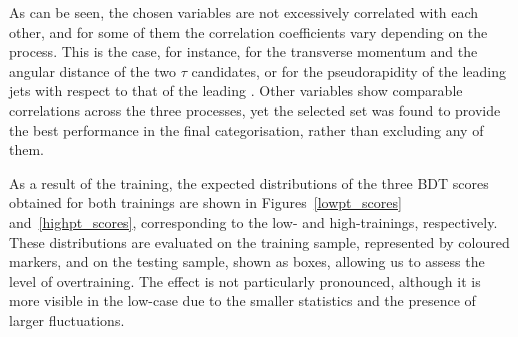 As can be seen, the chosen variables are not excessively correlated with each other, and for some of them the correlation coefficients vary depending on the process. This is the case, for instance, for the transverse momentum and the angular distance of the two $\tau$ candidates, or for the pseudorapidity of the leading jets with respect to that of the leading \tauhad. Other variables show comparable correlations across the three processes, yet the selected set was found to provide the best performance in the final categorisation, rather than excluding any of them.

As a result of the training, the expected distributions of the three BDT scores obtained for both trainings are shown in Figures~\ref{lowpt_scores} and~\ref{highpt_scores}, corresponding to the low- and high-\pth trainings, respectively. These distributions are evaluated on the training sample, represented by coloured markers, and on the testing sample, shown as boxes, allowing us to assess the level of overtraining. The effect is not particularly pronounced, although it is more visible in the low-\pth case due to the smaller statistics and the presence of larger fluctuations.  

